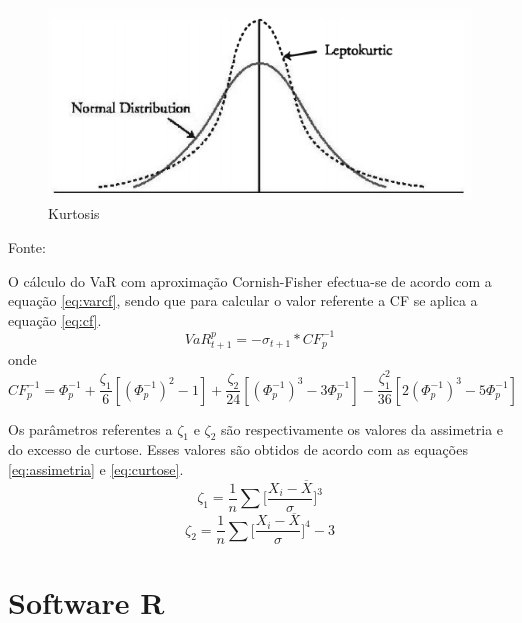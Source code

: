 \documentclass[
  12pt,
  a4paper,
  openany]{book}
\begin{document}
\begin{figure}

{\centering \includegraphics[width=0.6\linewidth]{image/kurtosis} 

}

\caption{Kurtosis}\label{fig:quant}
\end{figure}
\centering

Fonte: \citep[pp.46]{quant}

\justifying

O cálculo do VaR com aproximação Cornish-Fisher efectua-se de acordo com a equação \eqref{eq:varcf}, sendo que para calcular o valor referente a CF se aplica a equação \eqref{eq:cf}.
\begin{equation} 
  VaR_{t+1}^{p} = -\sigma_{t+1}*CF_{p}^{-1}
  \label{eq:varcf}
\end{equation}
onde
\begin{equation} 
  CF_{p}^{-1} = \Phi_{p}^{-1} + \frac{\zeta_{1}}{6}[(\Phi_{p}^{-1})^2-1] + \frac{\zeta_{2}}{24}[(\Phi_{p}^{-1})^3-3\Phi_{p}^{-1}] - \frac{\zeta_{1}^{2}}{36}[2(\Phi_{p}^{-1})^3-5\Phi_{p}^{-1}]
  \label{eq:cf}
\end{equation}

Os parâmetros referentes a \(\zeta_1\) e \(\zeta_2\) são respectivamente os valores da assimetria e do excesso de curtose. Esses valores são obtidos de acordo com as equações \eqref{eq:assimetria} e \eqref{eq:curtose}.
\begin{equation} 
 \zeta_1 = \frac{1}{n}\sum\bigg[\frac{X_i - \overline{X}}{\sigma}\bigg]^3
  \label{eq:assimetria}
\end{equation}
\begin{equation} 
 \zeta_2 = \frac{1}{n}\sum\bigg[\frac{X_i - \overline{X}}{\sigma}\bigg]^4 - 3
  \label{eq:curtose}
\end{equation}

\hypertarget{software-r}{%
\chapter{Software R}\label{software-r}}

\newpage
\end{document}
